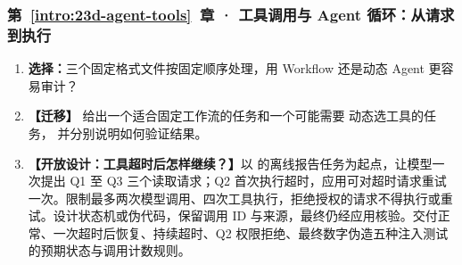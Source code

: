 \subsubsection*{第~\ref*{intro:23d-agent-tools}~章 · 工具调用与 Agent 循环：从请求到执行}
\begin{enumerate}[label={},leftmargin=4.8em,itemsep=4pt]
\item[\textbf{C-106.}] \leavevmode{}\label{exercise:C-106}\label{exercise:fixed-workflow-audit}\textbf{选择：}三个固定格式文件按固定顺序处理，用 Workflow 还是动态 Agent 更容易审计？
\item[\textbf{C-107.}] \leavevmode{}\label{exercise:C-107}\label{exercise:workflow-agent-choice}\textbf{【迁移】} 给出一个适合固定工作流的任务和一个可能需要  动态选工具的任务，
并分别说明如何验证结果。
\item[\textbf{C-108.}] \leavevmode{}\label{exercise:C-108}\label{exercise:agent-bounded-retry-design}\textbf{【开放设计：工具超时后怎样继续？】}以  的离线报告任务为起点，让模型一次提出 Q1 至 Q3 三个读取请求；Q2 首次执行超时，应用可对超时请求重试一次。限制最多两次模型调用、四次工具执行，拒绝授权的请求不得执行或重试。设计状态机或伪代码，保留调用 ID 与来源，最终仍经应用核验。交付正常、一次超时后恢复、持续超时、Q2 权限拒绝、最终数字伪造五种注入测试的预期状态与调用计数规则。
\end{enumerate}
